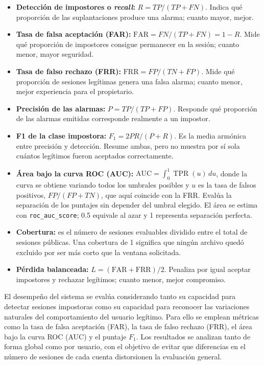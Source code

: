 \documentclass[11pt,letterpaper]{article}
\newcommand{\far}{\mathrm{FAR}}
\newcommand{\frr}{\mathrm{FRR}}
\newcommand{\auc}{\mathrm{AUC}}
\begin{document}
\begin{itemize}
  \item \textbf{Detección de impostores o \emph{recall}:}
  $R=TP/(TP+FN)$. Indica qué proporción de las suplantaciones produce una alarma; cuanto mayor, mejor.

  \item \textbf{Tasa de falsa aceptación (FAR):}
  $\far=FN/(TP+FN)=1-R$. Mide qué proporción de impostores consigue permanecer en la sesión; cuanto menor, mayor
  seguridad.

  \item \textbf{Tasa de falso rechazo (FRR):}
  $\frr=FP/(TN+FP)$. Mide qué proporción de sesiones legítimas genera una falsa alarma; cuanto menor, mejor
  experiencia para el propietario.

  \item \textbf{Precisión de las alarmas:}
  $P=TP/(TP+FP)$. Responde qué proporción de las alarmas emitidas corresponde realmente a un impostor.

  \item \textbf{F1 de la clase impostora:}
  $F_1=2PR/(P+R)$. Es la media armónica entre precisión y detección. Resume ambas, pero no muestra por sí sola
  cuántos
  legítimos fueron aceptados correctamente.

  \item \textbf{Área bajo la curva ROC (AUC):}
  $\auc=\int_0^1 \operatorname{TPR}(u)\,du$, donde la curva se obtiene variando todos los umbrales posibles y $u$ es
  la tasa de falsos positivos, $FP/(FP+TN)$, que aquí coincide con la FRR. Evalúa la separación de los puntajes sin
  depender del umbral elegido. El área se estima con \texttt{roc\_auc\_score}; 0.5 equivale al azar y 1 representa
  separación perfecta.

  \item \textbf{Cobertura:}
  es el número de sesiones evaluables dividido entre el total de sesiones públicas. Una cobertura de 1 significa que
  ningún archivo quedó excluido por ser más corto que la ventana solicitada.

  \item \textbf{Pérdida balanceada:}
  $L=(\far+\frr)/2$. Penaliza por igual aceptar impostores y rechazar legítimos; cuanto menor, mejor compromiso.
\end{itemize}

El desempeño del sistema se evalúa considerando tanto su capacidad para detectar sesiones impostoras como su
capacidad para reconocer las variaciones naturales del comportamiento del usuario legítimo.
Para ello se emplean métricas como la tasa de falsa aceptación (FAR), la tasa de falso rechazo (FRR),
el área bajo la curva ROC (AUC) y el puntaje $F_1$. Los resultados se analizan tanto de forma global como por usuario,
con el objetivo de evitar que diferencias en el número de sesiones de cada cuenta distorsionen la evaluación general.
\end{document}
